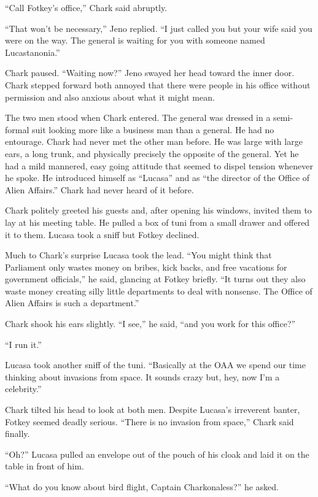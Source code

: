 ``Call Fotkey's office,'' Chark said abruptly.

``That won't be necessary,'' Jeno replied. ``I just called you but your wife said you were on
the way. The general is waiting for you with someone named Lucastanonia.''

Chark paused. ``Waiting now?'' Jeno swayed her head toward the inner door. Chark stepped forward
both annoyed that there were people in his office without permission and also anxious about what
it might mean.

The two men stood when Chark entered. The general was dressed in a semi-formal suit looking more
like a business man than a general. He had no entourage. Chark had never met the other man
before. He was large with large ears, a long trunk, and physically precisely the opposite of the
general. Yet he had a mild mannered, easy going attitude that seemed to dispel tension whenever
he spoke. He introduced himself as ``Lucasa'' and as ``the director of the Office of Alien
Affairs.'' Chark had never heard of it before.

Chark politely greeted his guests and, after opening his windows, invited them to lay at his
meeting table. He pulled a box of tuni from a small drawer and offered it to them. Lucasa took a
sniff but Fotkey declined.

Much to Chark's surprise Lucasa took the lead. ``You might think that Parliament only wastes
money on bribes, kick backs, and free vacations for government officials,'' he said, glancing at
Fotkey briefly. ``It turns out they also waste money creating silly little departments to deal
with nonsense. The Office of Alien Affairs is such a department.''

Chark shook his ears slightly. ``I see,'' he said, ``and you work for this office?''

``I run it.''

Lucasa took another sniff of the tuni. ``Basically at the OAA we spend our time thinking about
invasions from space. It sounds crazy but, hey, now I'm a celebrity.''

Chark tilted his head to look at both men. Despite Lucasa's irreverent banter, Fotkey seemed
deadly serious. ``There is no invasion from space,'' Chark said finally.

``Oh?'' Lucasa pulled an envelope out of the pouch of his cloak and laid it on the table in
front of him.

``What do you know about bird flight, Captain Charkonaless?'' he asked.

